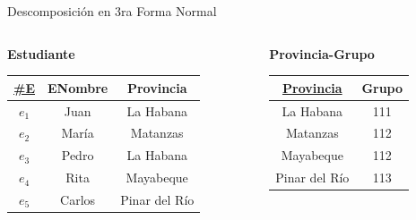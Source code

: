 \begin{frame}{Descomposici\'on en 3ra Forma Normal}
    \vspace{-3mm}
    \begin{columns}[T]
        \begin{column}{0.68\linewidth}
            \begin{columns}[T]
                \begin{column}{0.6\textwidth}
                    \begin{center}
                        \textbf{Estudiante}\\[2mm]
        
                        \begin{tabular}{ccc}
                            \underline{\#E} & ENombre & Provincia\\[1mm]
                            \hline
                            $e_1$ & Juan & La Habana\\
                            $e_2$ & Mar\'ia & Matanzas\\
                            $e_3$ & Pedro & La Habana\\
                            $e_4$ & Rita & Mayabeque\\
                            $e_5$ & Carlos & Pinar del R\'io
                        \end{tabular}
                    \end{center}
                \end{column}

                \begin{column}{0.4\textwidth}
                    \begin{center}
                        \textbf{Provincia-Grupo}\\[2mm]
        
                        \begin{tabular}{cc}
                            \underline{Provincia} & Grupo\\[1mm]
                            \hline
                            La Habana & 111\\
                            Matanzas & 112 \\
                            Mayabeque & 112 \\
                            Pinar del R\'io & 113
                            
                        \end{tabular}
                    \end{center}
                \end{column}
                

\end{columns}
\end{column}
\end{columns}
\end{frame}

